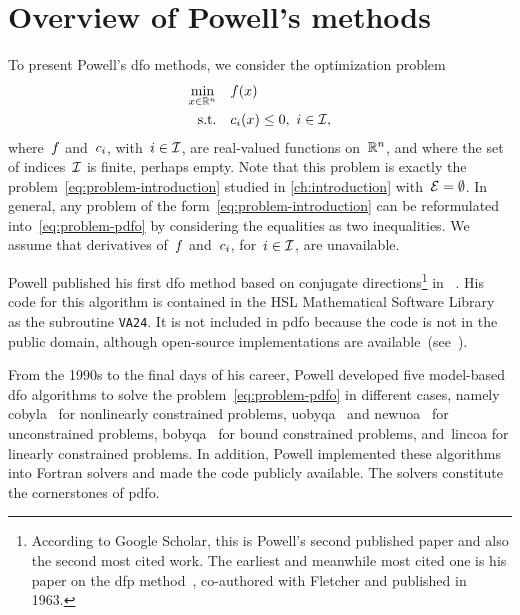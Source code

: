 \section{Overview of Powell's  methods}
\label{sec:powell}

To present Powell's \gls{dfo} methods, we consider the optimization problem
\begin{subequations}
    \label{eq:problem-pdfo}
    \begin{align}
        \min_{\iter \in \R^n}   & \quad \obj(\iter)\\
        \text{s.t.}             & \quad \con{i}(\iter) \le 0, ~ i \in \iub,
    \end{align}
\end{subequations}
where~$f$ and~$c_{i}$, with~$i \in \mathcal{I}$, are real-valued functions on~$\mathbb{R}^n$, and where the set of indices~$\mathcal{I}$ is finite, perhaps empty.
Note that this problem is exactly the problem~\cref{eq:problem-introduction} studied in \cref{ch:introduction} with~$\mathcal{E} = \emptyset$.
In general, any problem of the form~\cref{eq:problem-introduction} can be reformulated into~\cref{eq:problem-pdfo} by considering the equalities as two inequalities.
We assume that derivatives of~$f$ and~$c_{i}$, for~$i \in \mathcal{I}$, are unavailable.

Powell published his first \gls{dfo} method based on conjugate directions\footnote{According to Google Scholar, this is Powell's second published paper and also the second most cited work. The earliest and meanwhile most cited one is his paper on the \gls{dfp} method~\cite{Fletcher_Powell_1963}, co-authored with Fletcher and published in 1963.} in \citeyear{Powell_1964}~\cite{Powell_1964}.
His code for this algorithm is contained in the HSL Mathematical Software Library~\cite{HSL} as the subroutine \texttt{VA24}.
It is not included in \gls{pdfo} because the code is not in the public domain, although open-source implementations are available~(see~\cite[Fn.~4]{Conn_Scheinberg_Toint_1997b}).

From the 1990s to the final days of his career, Powell developed five model-based \gls{dfo} algorithms to solve the problem~\cref{eq:problem-pdfo} in different cases, namely \gls{cobyla}~\cite{Powell_1994} for nonlinearly constrained problems, \gls{uobyqa}~\cite{Powell_2002} and \gls{newuoa}~\cite{Powell_2006} for unconstrained problems, \gls{bobyqa}~\cite{Powell_2009} for bound constrained problems, and~\gls{lincoa} for linearly constrained problems.
In addition, Powell implemented these algorithms into Fortran solvers and made the code publicly available.
The solvers constitute the cornerstones of \gls{pdfo}.

